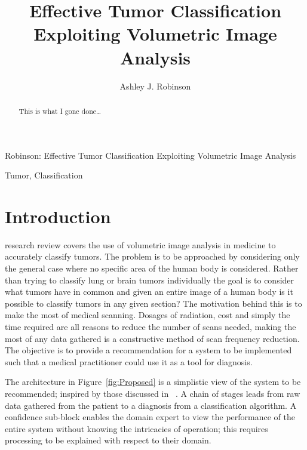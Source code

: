 \documentclass[journal]{IEEEtran}
\begin{document}
\title{Effective Tumor Classification Exploiting Volumetric Image Analysis}
\author{Ashley J. Robinson}

%
{Robinson: Effective Tumor Classification Exploiting Volumetric Image Analysis}

\maketitle


\begin{abstract}

This is what I gone done\dots

\end{abstract}







\begin{IEEEkeywords}
Tumor, Classification
\end{IEEEkeywords}



\IEEEpeerreviewmaketitle



\section{Introduction}
 research review covers the use of volumetric image analysis in medicine to accurately classify tumors. 
The problem is to be approached by considering only the general case where no specific area of the human body is considered.
Rather than trying to classify lung or brain tumors individually the goal is to consider what tumors have in common and given an entire image of a human body is it possible to classify tumors in any given section?
The motivation behind this is to make the most of medical scanning.
Dosages of radiation, cost and simply the time required are all reasons to reduce the number of scans needed, making the most of any data gathered is a constructive method of scan frequency reduction.
The objective is to provide a recommendation for a system to be implemented such that a medical practitioner could use it as a tool for diagnosis.  

The architecture in Figure~\ref{fig:Proposed} is a simplistic view of the system to be recommended; inspired by those discussed in ~\cite{ahmed2011efficacy,kumar2011classification,sachdeva2011multiclass}.
A chain of stages leads from raw data gathered from the patient to a diagnosis from a classification algorithm.
A confidence sub-block enables the domain expert to view the performance of the entire system without knowing the intricacies of operation; this requires processing to be explained with respect to their domain.
\end{document}
